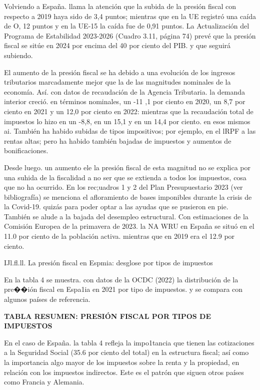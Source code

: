 \documentclass[10pt,a4paper]{article}
\begin{document}
Volviendo a España. llama la atención que la subida de la presión fiscal con respecto a 2019 haya sido de 3,4 puntos; mientras que en la UE registró una caída de O, 12 puntos y en la UE-15 la caída fue de 0,91 puntos. La Actualización del Programa de Estabilidad 2023-2026 (Cuadro 3.11, página 74) prevé que la presión fiscal se sitúe en 2024 por encima del 40 por ciento del PIB. y que seguirá subiendo.

El aumento de la presión fiscal se ha debido a una evolución de los ingresos tributarios marcadamente mejor que la de las magnitudes nominales de la economía. Así. con datos de recaudación de la Agencia Tributaria. la demanda interior creció. en términos nominales, un -11 ,1 por ciento en 2020, un 8,7 por ciento en 2021 y un 12,0 por ciento en 2022: mientras que la recaudación total de impuestos lo hizo en un -8,8, en un 15,1 y en un 14,4 por ciento. en esos mismos ai\os. También ha habido subidas de tipos impositivos; por ejemplo, en el lRPF a las rentas altas; pero ha habido también bajadas de impuestos y aumentos de bonificaciones.

Desde luego. un aumento ele la presión fiscal de esta magnitud no se explica por una suhida de la fiscalidad a no ser que se extienda a todos los impuestos, cosa que no ha ocurrido. En los rec;uadros 1 y 2 del Plan Presupuestario 2023 (ver bibliografía) se menciona el afloramiento de bases imponibles durante la crisis de la Covid-19. quizás para poder optar a las ayudas que se pusieron en pie. También se alude a la bajada del desempleo estructural. Con estimaciones de la Comisión Europea de la primavera de 2023. la NA WRU en España se situó en el 11.0 por ciento de la población activa. mientras que en 2019 era el 12.9 por ciento.


IJl.fl.ll. La presión fiscal en Espmia: desglose por tipos de impuestos

En la tabla 4 se muestra. con datos de la OCDC (2022) la distribución de la pre��ión fiscal en Espa1ia en 2021 por tipo de impuestos. y se compara con algunos países de referencia.

\textbf{TABLA RESUMEN: PRESIÓN FISCAL POR TIPOS DE IMPUESTOS}

En el caso de España. la tabla 4 refleja la impo1tancia que tienen las cotizaciones a la Seguridad Social (35.6 por ciento del total) en la estructura fiscal; así como la importancia algo mayor de los impuestos sobre la renta y la propiedad, en relación con los impuestos indirectos. Este es el patrón que siguen otros países como Francia y Alemania.
\end{document}
